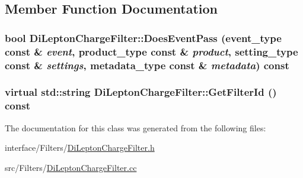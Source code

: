 \subsection{Member Function Documentation}
\hypertarget{classDiLeptonChargeFilter_a7bce114de296aaef564457583b09e4ee}{
\subsubsection[{DoesEventPass}]{\setlength{\rightskip}{0pt plus 5cm}bool DiLeptonChargeFilter::DoesEventPass (event\_\-type const \& {\em event}, \/  product\_\-type const \& {\em product}, \/  setting\_\-type const \& {\em settings}, \/  metadata\_\-type const \& {\em metadata}) const}}
\label{classDiLeptonChargeFilter_a7bce114de296aaef564457583b09e4ee}
\hypertarget{classDiLeptonChargeFilter_ac68bdf15416effa7af3240f26f12b75c}{
\subsubsection[{GetFilterId}]{\setlength{\rightskip}{0pt plus 5cm}virtual std::string DiLeptonChargeFilter::GetFilterId () const}}
\label{classDiLeptonChargeFilter_ac68bdf15416effa7af3240f26f12b75c}


The documentation for this class was generated from the following files:\begin{DoxyCompactItemize}
\item 
interface/Filters/\hyperlink{DiLeptonChargeFilter_8h}{DiLeptonChargeFilter.h}\item 
src/Filters/\hyperlink{DiLeptonChargeFilter_8cc}{DiLeptonChargeFilter.cc}\end{DoxyCompactItemize}
